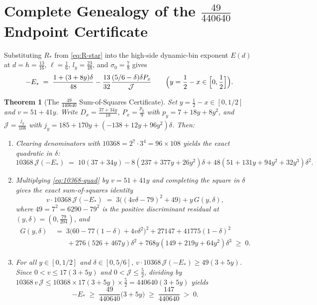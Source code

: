 \documentclass[11pt]{amsart}
\newtheorem{theorem}{Theorem}[section]
\theoremstyle{definition}
\theoremstyle{remark}
\begin{document}
\section{Complete Genealogy of the $\frac{49}{440640}$ Endpoint Certificate}

Substituting $R_*$ from \eqref{eq:R-star} into the high-side dynamic-bin exponent $E(d)$ at $d = h = \frac{13}{16}$, $\ell = \frac{1}{6}$, $l_y = \frac{23}{48}$, and $\sigma_0 = \frac{7}{8}$ gives
\[
  -E_* \;=\; \frac{1 + (3 + 8y)\delta}{48} - \frac{13}{32}\frac{(5/6 - \delta)\delta P_x}{\mathcal{J}}
  \qquad \Bigl(y = \frac{1}{2} - x \in \Bigl[0, \frac{1}{2}\Bigr]\Bigr).
\]

\begin{theorem}[The $\frac{49}{440640}$ Sum-of-Squares Certificate]\label{thm:49-440640}
Set $y = \frac{1}{2} - x \in [0, 1/2]$ and $v = 51 + 41y$. Write $D_x = \frac{37 + 34y}{18}$, $P_x = \frac{p_y}{9}$ with $p_y = 7 + 18y + 8y^2$, and $\mathcal{J} = \frac{j_y}{108}$ with $j_y = 185 + 170y + (-138 + 12y + 96y^2)\delta$. Then:
\begin{enumerate}
  \item Clearing denominators with $10368 = 2^7 \cdot 3^4 = 96 \times 108$ yields the exact quadratic in $\delta$:
  \begin{equation}\label{eq:10368-quad}
    10368\,\mathcal{J}(-E_*) \;=\; 10(37 + 34y) - 8(237 + 377y + 26y^2)\delta + 48(51 + 131y + 94y^2 + 32y^3)\delta^2.
  \end{equation}
  \item Multiplying \eqref{eq:10368-quad} by $v = 51 + 41y$ and completing the square in $\delta$ gives the exact sum-of-squares identity
  \begin{equation}\label{eq:sos}
    v \cdot 10368\,\mathcal{J}(-E_*) \;=\; 3\bigl((4v\delta - 79)^2 + 49\bigr) + y\,G(y, \delta),
  \end{equation}
  where $49 = 7^2 = 6290 - 79^2$ is the positive discriminant residual at $(y, \delta) = (0, \frac{79}{204})$, and
  \begin{align*}
    G(y, \delta) &\;=\; 3\bigl(60 - 77(1 - \delta) + 4v\delta^2\bigr)^2 + 27147 + 41775(1 - \delta)^2 \\
    &\qquad + 276(526 + 467y)\delta^2 + 768y(149 + 219y + 64y^2)\delta^3 \;\ge\; 0.
  \end{align*}
  \item For all $y \in [0, 1/2]$ and $\delta \in [0, 5/6]$, $v \cdot 10368\,\mathcal{J}(-E_*) \ge 49(3 + 5y)$. Since $0 < v \le 17(3 + 5y)$ and $0 < \mathcal{J} \le \frac{5}{2}$, dividing by $10368\,v\,\mathcal{J} \le 10368 \times 17(3 + 5y) \times \frac{5}{2} = 440640(3 + 5y)$ yields
  \[
    -E_* \;\ge\; \frac{49}{440640}\bigl(3 + 5y\bigr) \;\ge\; \frac{147}{440640} \;>\; 0.
  \]
\end{enumerate}
\end{theorem}
\end{document}
